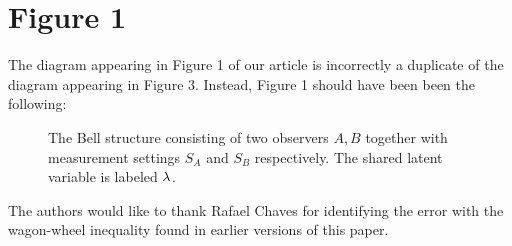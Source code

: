 \documentclass[aps, 10pt, english, twoside, pra, nofootinbib, tightenlines, longbibliography, superscriptaddress, notitlepage]{revtex4-1}
\begin{document}
    \section{Figure 1}
    The diagram appearing in Figure 1 of our article is incorrectly a duplicate of the diagram appearing in Figure 3. Instead, Figure 1 should have been been the following:
    \begin{figure}
        \centering
        \caption{The Bell structure consisting of two observers $A, B$ together with measurement settings $S_{A}$ and $S_{B}$ respectively. The shared latent variable is labeled $\lambda$.}
        \label{fig:bell_structure}
    \end{figure}




    \begin{acknowledgments}
        The authors would like to thank Rafael Chaves for identifying the error with the wagon-wheel inequality found in earlier versions of this paper.
    \end{acknowledgments}

    \nocite{apsrev41Control}
    
\end{document}
